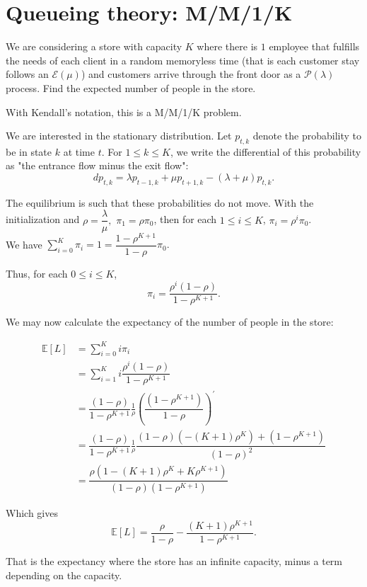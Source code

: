 \section{Queueing theory: M/M/1/K}

\begin{tcolorbox}[width=\linewidth, sharp corners=all, colback=white!95!black]
We are considering a store with capacity $K$ where there is $1$ employee that fulfills the needs of each client in a random memoryless time (that is each customer stay follows an $\mathcal{E}(\mu)$) and customers arrive through the front door as a $\mathcal{P}(\lambda)$ process. Find the expected number of people in the store.
\end{tcolorbox}

With Kendall's notation, this is a M/M/1/K problem.

We are interested in the stationary distribution. Let $p_{t,k}$ denote the probability to be in state $k$ at time $t$. For $1\le k \le K$, we write the differential of this probability as "the entrance flow minus the exit flow":
$$dp_{t,k} = \lambda p_{t-1,k} + \mu p_{t+1,k} - (\lambda+\mu) p_{t,k}.$$

The equilibrium is such that these probabilities do not move. With the initialization and $\rho = \dfrac{\lambda}{\mu},$ $\pi_1 = \rho\pi_0$, then for each $1\le i \le K$, $\pi_i = \rho^{i} \pi_0$.\\
We have $\sum_{i=0}^K \pi_i = 1 = \dfrac{1-\rho^{K+1}}{1-\rho}\pi_0.$

Thus, for each $0\le i \le K$, $$\pi_i = \dfrac{\rho^{i}(1-\rho)}{1-\rho^{K+1}}.$$

We may now calculate the expectancy of the number of people in the store: 

\begin{align*}
    \mathbb{E}[L] &= \displaystyle \sum_{i=0}^K i \pi_i\\
    &= \displaystyle \sum_{i=1}^K i \dfrac{\rho^{i}(1-\rho)}{1-\rho^{K+1}}\\
    &= \dfrac{(1-\rho)}{1-\rho^{K+1}} \frac1{\rho} \left(\dfrac{(1-\rho^{K+1})}{1-\rho}\right)^{'}\\
    &= \dfrac{(1-\rho)}{1-\rho^{K+1}} \frac1{\rho} \dfrac{(1-\rho)(-(K+1)\rho^K) + (1-\rho^{K+1})}{(1-\rho)^2}\\
    &= \dfrac{\rho(1-(K+1)\rho^K+K\rho^{K+1})}{(1-\rho)(1-\rho^{K+1})}
\end{align*}

Which gives $$\mathbb{E}[L] = \dfrac\rho{1-\rho}-\frac{(K+1)\rho^{K+1}}{1-\rho^{K+1}}.$$

That is the expectancy where the store has an infinite capacity, minus a term depending on the capacity.